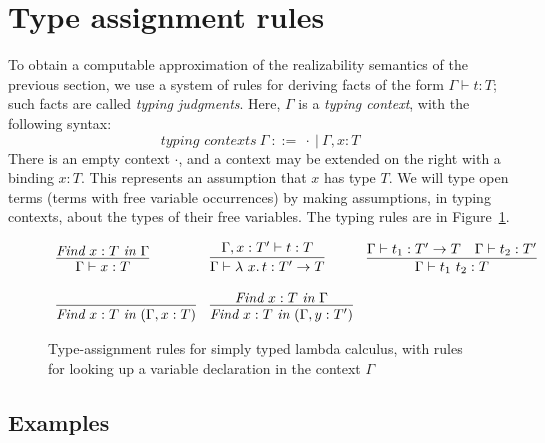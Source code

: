 
\section{Type assignment rules}

To obtain a computable approximation of the realizability semantics of the previous section,
we use a system of rules for deriving facts of the form $\Gamma \vdash t : T$; such facts
are called \emph{typing judgments}.  Here, $\Gamma$
is a \emph{typing context}, with the following syntax:
\[
\textit{typing contexts}\ \Gamma\ ::=\ \cdot\ |\ \Gamma , x : T
\]
\noindent There is an empty context $\cdot$, and a context may be
extended on the right with a binding $x : T$.  This represents an
assumption that $x$ has type $T$.  We will type open terms (terms with
free variable occurrences) by making assumptions, in typing contexts,
about the types of their free variables.  The typing rules are in Figure~\ref{fig:stlctpassign}.

\begin{figure}
\[
\begin{array}{lll}
\infer{\Gamma\vdash x : T}{\textit{Find}\ x:T\ \textit{in}\ \Gamma} 

&

\infer{\Gamma\vdash \lam{x}{t} : T' \to T}
      {\Gamma,x:T'\vdash t:T}

&

\infer{\Gamma\vdash t_1\ t_2 : T}
      {\Gamma\vdash t_1 : T' \to T &
       \Gamma\vdash t_2 : T'}
      \\
      \\

\infer{\textit{Find}\ x:T\ \textit{in}\ (\Gamma, x:T)}{\ }

&

\infer{\textit{Find}\ x:T\ \textit{in}\ (\Gamma, y:T')}{\textit{Find}\ x:T\ \textit{in}\ \Gamma}

&

\ 
\end{array}
\]
\caption{Type-assignment rules for simply typed lambda calculus, with rules for looking up a variable declaration in the context $\Gamma$}
\label{fig:stlctpassign}
\end{figure}

\subsection{Examples}

